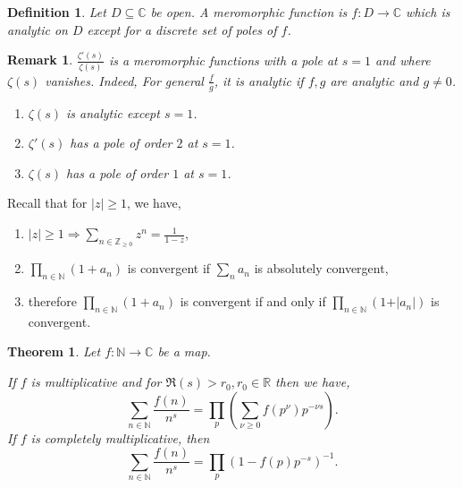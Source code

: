 \documentclass{article}
\newtheorem{theorem}{Theorem} [section]
\newtheorem{definition}{Definition}[section]
\newtheorem{remark}{Remark}[section]
\newcommand{\N}[0]{\mathbb{N}}
\newcommand{\R}[0]{\mathbb{R}}
\newcommand{\Z}[0]{\mathbb{Z}}
\newcommand{\C}[0]{\mathbb{C}}
\begin{document}
\begin{definition}
  Let $D\subseteq\C$ be open. A meromorphic function is $f:D\to\C$ which is analytic on $D$ except for a discrete set of poles of $f$.
\end{definition}
\begin{remark}
  ${\frac {\zeta'(s)} {\zeta(s)}}$ is a meromorphic functions with a pole at $s=1$ and where $\zeta(s)$ vanishes. Indeed, 
  For general ${\frac f g}$, it is analytic if $f,g$ are analytic and $g\not=0$. 
  \begin{enumerate}[1).]
    \item $\zeta(s)$ is analytic except $s=1$. 
    \item $\zeta'(s)$ has a pole of order $2$ at $s=1$.
    \item $\zeta(s)$ has a pole of order $1$ at $s=1$.
  \end{enumerate}
\end{remark}

Recall that for $\vert z\vert \geq 1$, we have,

\begin{enumerate}
  \item $\vert z\vert \geq 1\Rightarrow\sum_{n\in\Z_{\geq0}}z^n = {\frac 1 {1-z}}$,
  \item $\prod_{n\in\N}(1+a_n)$ is convergent if $\sum_n a_n$ is absolutely convergent,
  \item therefore $\prod_{n\in\N}(1+a_n)$ is convergent if and only if $\prod_{n\in\N}(1+\vert a_n\vert)$ is convergent.
\end{enumerate}

\begin{theorem}
  Let $f:\N\to \C$ be a map.
  \par If $f$ is multiplicative and for $\Re(s)>r_0,r_0\in\R$ then we have,
  \begin{equation*}
    \sum_{n\in\N}{\frac {f(n)} {n^s}} = \prod_{p}\left(\sum_{\nu\geq0}f(p^{\nu})p^{-\nu s}\right).
  \end{equation*}
  If $f$ is completely multiplicative, then 
  \begin{equation*}
    \sum_{n\in\N}{\frac {f(n)} {n^s}} = \prod_{p}(1-f(p)p^{-s})^{-1}.
  \end{equation*}
  \label{theorem_dirichlet_euler_product_forumula}
\end{theorem}
\end{document}
